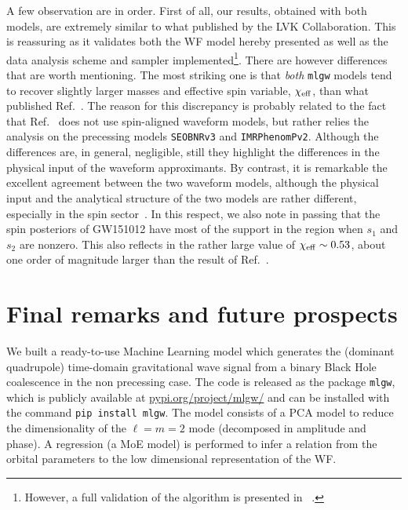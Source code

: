 A few observation are in order. First of all, our results, obtained with both models,
are extremely similar to what published by the LVK Collaboration. 
This is reassuring as it validates both the WF model hereby presented 
as well as the data analysis scheme and sampler 
implemented\footnote{However, a full validation of the algorithm is presented in ~\cite{gwmodel}.}.
There are however differences that are worth mentioning. The most striking one is that
{\it both} \texttt{mlgw} models tend to recover slightly larger masses and effective 
spin variable, $\chi_{\rm eff}$, than what published Ref.~\cite{LIGOScientific:2018mvr}.
The reason for this discrepancy is probably related to the fact that Ref.~\cite{LIGOScientific:2018mvr}
does not use spin-aligned waveform models, but rather relies the analysis on 
the precessing models \texttt{SEOBNRv3} and \texttt{IMRPhenomPv2}. Although the differences 
are, in general, negligible, still they highlight the differences in the physical input of 
the waveform approximants. By contrast, it is remarkable the excellent agreement between the
two waveform models, although the physical input and the analytical structure of the
two models are rather different, especially in the spin sector~\cite{Rettegno:2019tzh}.
In this respect, we also note in passing that the spin posteriors of GW151012 have
most of the support in the region when $s_1$ and $s_2$ are nonzero. This also
reflects in the rather large value of $\chi_{\rm eff}\sim 0.53$, about one order of magnitude
larger than the result of Ref.~\cite{LIGOScientific:2018mvr}.

\section{Final remarks and future prospects}
\label{sec:end}
We built a ready-to-use Machine Learning model which generates the (dominant quadrupole) time-domain gravitational wave 
signal from a binary Black Hole coalescence in the non precessing case. The code is released as the package \texttt{mlgw}, which is publicly available at 
\href{https://pypi.org/project/mlgw/}{pypi.org/project/mlgw/} and can be installed with the command \texttt{pip install mlgw}.
The model consists of a PCA model to reduce the dimensionality of the $\ell=m=2$ mode (decomposed in amplitude and phase). 
A regression (a MoE model) is performed to infer a relation from the orbital parameters to the low dimensional representation of the WF.

